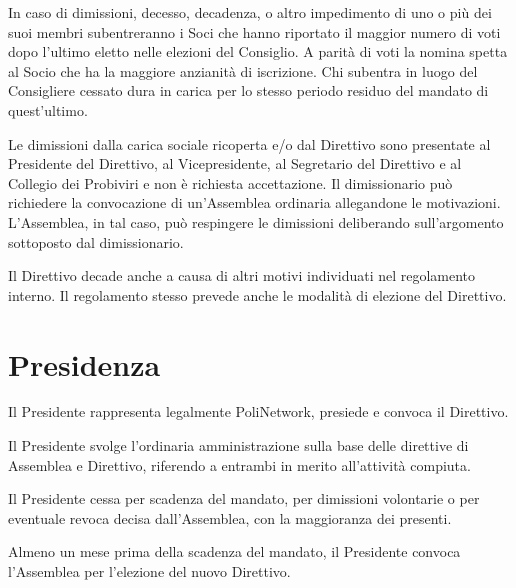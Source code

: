 \documentclass[legalpaper, 11pt]{exam}
\let\tempone\enumerate
\let\temptwo\endenumerate
\renewenvironment{enumerate}{\tempone\addtolength{\itemsep}{-0.45\baselineskip}}{\temptwo}
\begin{document}
{\begin{enumerate}
\item In caso di dimissioni, decesso, decadenza, o altro impedimento di uno o più dei suoi membri subentreranno i Soci che hanno riportato il maggior numero di voti dopo l’ultimo eletto nelle elezioni del Consiglio. A parità di voti la nomina spetta al Socio che ha la maggiore anzianità di iscrizione. Chi subentra in luogo del Consigliere cessato dura in carica per lo stesso periodo residuo del mandato di quest’ultimo.
\item Le dimissioni dalla carica sociale ricoperta e/o dal Direttivo sono presentate al Presidente del Direttivo, al Vicepresidente, al Segretario del Direttivo e al Collegio dei Probiviri e non è richiesta accettazione. Il dimissionario può richiedere la convocazione di un’Assemblea ordinaria allegandone le motivazioni. L’Assemblea, in tal caso, può respingere le dimissioni deliberando sull’argomento sottoposto dal dimissionario.
\item Il Direttivo decade anche a causa di altri motivi individuati nel regolamento interno. Il regolamento stesso prevede anche le modalità di elezione del Direttivo.
\end{enumerate}

\section{Presidenza}
\begin{enumerate}
 \item Il Presidente rappresenta legalmente PoliNetwork, presiede e convoca il Direttivo.
 \item Il Presidente svolge l’ordinaria amministrazione sulla base delle direttive di Assemblea e Direttivo, riferendo a entrambi in merito all’attività compiuta.
 \item Il Presidente cessa per scadenza del mandato, per dimissioni volontarie o per eventuale revoca decisa dall’Assemblea, con la maggioranza dei presenti.
 \item Almeno un mese prima della scadenza del mandato, il Presidente convoca l’Assemblea per l’elezione del nuovo Direttivo.
\end{enumerate}

}
\end{document}
